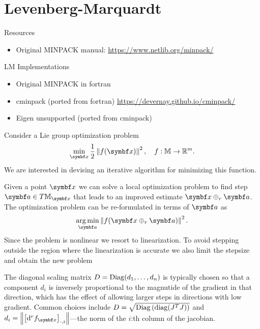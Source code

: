 \section{Levenberg-Marquardt}

Resources
\begin{itemize}
  \item Original MINPACK manual: \url{https://www.netlib.org/minpack/}
\end{itemize}

LM Implementations
\begin{itemize}
  \item Original MINPACK in fortran
  \item cminpack (ported from fortran) \url{https://devernay.github.io/cminpack/}
  \item Eigen unsupported (ported from cminpack)
\end{itemize}


Consider a Lie group optimization problem
\begin{equation}
  \min_\x \frac{1}{2} \left\| f(\x) \right\|^2, \quad f : \M \rightarrow \mathbb{R}^m.
\end{equation}
We are interested in devising an iterative algorithm for minimizing this function.

Given a point $\x$ we can solve a local optimization problem to find step $\a \in T \M _\x$ that leads to an improved estimate $\x \oplus_r \a$. The optimization problem can be re-formulated in terms of $\a$ as
\begin{equation}
  \argmin_{\a} \left\| f(\x \oplus_r \a) \right\|^2.
\end{equation}
Since the problem is nonlinear we resort to linearization. To avoid stepping outside the region where the linearization is accurate we also limit the stepsize and obtain the new problem

The diagonal scaling matrix $D = \operatorname{Diag} (d_1, \ldots, d_n)$ is typically chosen so that a component $d_i$ is inversely proportional to the magnutide of the gradient in that direction, which has the effect of allowing larger steps in directions with low gradient. Common choices include $D = \sqrt{\operatorname{Diag} \left(\operatorname{diag}(J^T J) \right)}$ and $d_i = \left\| \left[ \mathrm{d}^r f_\x \right]_{\cdot, i} \right\|$---the norm of the $i$:th column of the jacobian.


